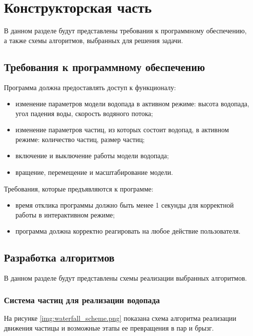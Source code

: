 \chapter{Конструкторская часть}

В данном разделе будут представлены требования к программному обеспечению, а также схемы алгоритмов, выбранных для решения задачи.


\section{Требования к программному обеспечению}

Программа должна предоставлять доступ к функционалу:

\begin{itemize}
    \item изменение параметров модели водопада в активном режиме: высота водопада, угол падения воды, скорость водяного потока;
    \item изменение параметров частиц, из которых состоит водопад, в активном режиме: количество частиц, размер частиц;
    \item включение и выключение работы модели водопада;
    \item вращение, перемещение и масштабирование модели.
\end{itemize}

Требования, которые предъявляются к программе:

\begin{itemize}
    \item время отклика программы должно быть менее 1 секунды для корректной работы в интерактивном режиме;
    \item программа должна корректно реагировать на любое действие пользователя.
\end{itemize}


\section{Разработка алгоритмов}

В данном разделе будут представлены схемы реализации выбранных алгоритмов.

\subsection{Система частиц для реализации водопада}

На рисунке \ref{img:waterfall_scheme.png} показана схема алгоритма реализации движения частицы и возможные этапы ее превращения в пар и брызг.

